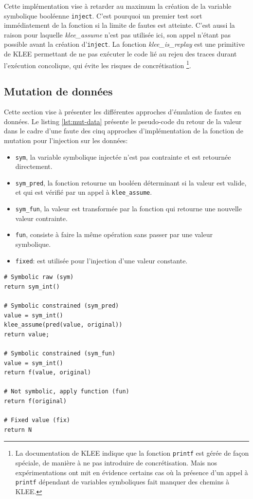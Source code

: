             Cette implémentation vise à retarder au maximum la création de la variable symbolique booléenne \texttt{inject}. C'est pourquoi un premier test sort immédiatement de la fonction si la limite de fautes est atteinte. C'est aussi la raison pour laquelle \textit{klee\_assume} n'est pas utilisée ici, son appel n'étant pas possible avant la création d'\texttt{inject}.
            La fonction \textit{klee\_is\_replay} est une primitive de KLEE permettant de ne pas exécuter le code lié au rejeu des traces durant l'exécution concolique, qui évite les risques de concrétisation \footnote{La documentation de KLEE indique que la fonction \texttt{printf} est gérée de façon spéciale, de manière à ne pas introduire de concrétisation. Mais nos expérimentations ont mit en évidence certains cas où la présence d'un appel à \texttt{printf} dépendant de variables symboliques fait manquer des chemins à KLEE.}.
 	
        \subsection{Mutation de données}
        \label{sec:lazart-mfct-data}
            
            Cette section vise à présenter les différentes approches d'émulation de fautes en données.
            Le listing \ref{lst:mut-data} présente le pseudo-code du retour de la valeur dans le cadre d'une faute des cinq approches d'implémentation de la fonction de mutation pour l'injection sur les données:
            \begin{itemize}
                \item \texttt{sym}, la variable symbolique injectée n'est pas contrainte et est retournée directement.
                \item \texttt{sym\_pred}, la fonction retourne un booléen déterminant si la valeur est valide, et qui est vérifié par un appel à \texttt{klee\_assume}. 
                \item \texttt{sym\_fun}, la valeur est transformée par la fonction qui retourne une nouvelle valeur contrainte.
                \item  \texttt{fun}, consiste à faire la même opération sans passer par une valeur symbolique.
                \item \texttt{fixed}: est utilisée pour l'injection d'une valeur constante.
            \end{itemize} 
                
\begin{lstlisting}   
# Symbolic raw (sym)
return sym_int()
    
# Symbolic constrained (sym_pred)
value = sym_int()
klee_assume(pred(value, original))
return value;

# Symbolic constrained (sym_fun)
value = sym_int()
return f(value, original)
    
# Not symbolic, apply function (fun)
return f(original)
    
# Fixed value (fix)
return N
                \end{lstlisting}

